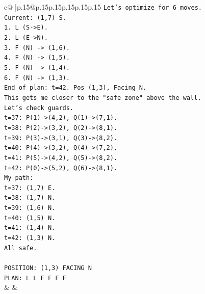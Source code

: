 \documentclass{article}
\begin{document}
{\begin{supertabular}{c@{$\;$}|p{.15\linewidth}@{}p{.15\linewidth}p{.15\linewidth}p{.15\linewidth}p{.15\linewidth}p{.15\linewidth}}
{{{\texttt{Let's optimize for 6 moves.} \\
\texttt{Current: (1,7) S.} \\
\texttt{1. L (S{-}>E).} \\
\texttt{2. L (E{-}>N).} \\
\texttt{3. F (N) {-}> (1,6).} \\
\texttt{4. F (N) {-}> (1,5).} \\
\texttt{5. F (N) {-}> (1,4).} \\
\texttt{6. F (N) {-}> (1,3).} \\
\texttt{End of plan: t=42. Pos (1,3), Facing N.} \\
\texttt{This gets me closer to the "safe zone" above the wall.} \\
\texttt{Let's check guards.} \\
\texttt{t=37: P(1){-}>(4,2), Q(1){-}>(7,1).} \\
\texttt{t=38: P(2){-}>(3,2), Q(2){-}>(8,1).} \\
\texttt{t=39: P(3){-}>(3,1), Q(3){-}>(8,2).} \\
\texttt{t=40: P(4){-}>(3,2), Q(4){-}>(7,2).} \\
\texttt{t=41: P(5){-}>(4,2), Q(5){-}>(8,2).} \\
\texttt{t=42: P(0){-}>(5,2), Q(6){-}>(8,1).} \\
\texttt{My path:} \\
\texttt{t=37: (1,7) E.} \\
\texttt{t=38: (1,7) N.} \\
\texttt{t=39: (1,6) N.} \\
\texttt{t=40: (1,5) N.} \\
\texttt{t=41: (1,4) N.} \\
\texttt{t=42: (1,3) N.} \\
\texttt{All safe.} \\
\\ 
\texttt{POSITION: (1,3) FACING N} \\
\texttt{PLAN: L L F F F F} \\
            }
        }
    }
    & & \\ \\


\end{supertabular}}
\end{document}
